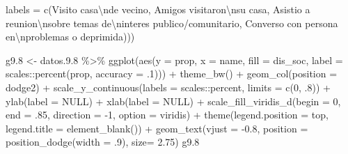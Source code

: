 \documentclass[
  12pt,
]{book}
\newenvironment{Shaded}{\begin{snugshade}}{\end{snugshade}}
\newcommand{\AttributeTok}[1]{\textcolor[rgb]{0.77,0.63,0.00}{#1}}
\newcommand{\ConstantTok}[1]{\textcolor[rgb]{0.00,0.00,0.00}{#1}}
\newcommand{\DecValTok}[1]{\textcolor[rgb]{0.00,0.00,0.81}{#1}}
\newcommand{\FloatTok}[1]{\textcolor[rgb]{0.00,0.00,0.81}{#1}}
\newcommand{\FunctionTok}[1]{\textcolor[rgb]{0.00,0.00,0.00}{#1}}
\newcommand{\NormalTok}[1]{#1}
\newcommand{\OtherTok}[1]{\textcolor[rgb]{0.56,0.35,0.01}{#1}}
\newcommand{\SpecialCharTok}[1]{\textcolor[rgb]{0.00,0.00,0.00}{#1}}
\newcommand{\StringTok}[1]{\textcolor[rgb]{0.31,0.60,0.02}{#1}}
\begin{document}
\begin{Shaded}
\begin{Highlighting}[]
                       \AttributeTok{labels =} \FunctionTok{c}\NormalTok{(}\StringTok{\textquotesingle{}Visito casa}\SpecialCharTok{\textbackslash{}n}\StringTok{de vecino\textquotesingle{}}\NormalTok{,}
                               \StringTok{\textquotesingle{}Amigos visitaron}\SpecialCharTok{\textbackslash{}n}\StringTok{su casa\textquotesingle{}}\NormalTok{,}
                               \StringTok{\textquotesingle{}Asistio a reunion}\SpecialCharTok{\textbackslash{}n}\StringTok{sobre temas de}\SpecialCharTok{\textbackslash{}n}\StringTok{interes publico/comunitario\textquotesingle{}}\NormalTok{,}
                               \StringTok{\textquotesingle{}Converso con persona en}\SpecialCharTok{\textbackslash{}n}\StringTok{problemas o deprimida\textquotesingle{}}\NormalTok{)))}

\NormalTok{g9}\FloatTok{.8} \OtherTok{\textless{}{-}}\NormalTok{ datos.}\FloatTok{9.8} \SpecialCharTok{\%\textgreater{}\%} 
  \FunctionTok{ggplot}\NormalTok{(}\FunctionTok{aes}\NormalTok{(}\AttributeTok{y =}\NormalTok{ prop, }\AttributeTok{x =}\NormalTok{ name, }\AttributeTok{fill =}\NormalTok{ dis\_soc, }
             \AttributeTok{label =}\NormalTok{ scales}\SpecialCharTok{::}\FunctionTok{percent}\NormalTok{(prop, }\AttributeTok{accuracy =}\NormalTok{ .}\DecValTok{1}\NormalTok{))) }\SpecialCharTok{+} 
  \FunctionTok{theme\_bw}\NormalTok{() }\SpecialCharTok{+} 
  \FunctionTok{geom\_col}\NormalTok{(}\AttributeTok{position =} \StringTok{\textquotesingle{}dodge2\textquotesingle{}}\NormalTok{) }\SpecialCharTok{+}
  \FunctionTok{scale\_y\_continuous}\NormalTok{(}\AttributeTok{labels =}\NormalTok{ scales}\SpecialCharTok{::}\NormalTok{percent,}
                     \AttributeTok{limits =} \FunctionTok{c}\NormalTok{(}\DecValTok{0}\NormalTok{, .}\DecValTok{8}\NormalTok{)) }\SpecialCharTok{+}
  \FunctionTok{ylab}\NormalTok{(}\AttributeTok{label =} \ConstantTok{NULL}\NormalTok{) }\SpecialCharTok{+}
  \FunctionTok{xlab}\NormalTok{(}\AttributeTok{label =} \ConstantTok{NULL}\NormalTok{) }\SpecialCharTok{+}
  \FunctionTok{scale\_fill\_viridis\_d}\NormalTok{(}\AttributeTok{begin =} \DecValTok{0}\NormalTok{, }\AttributeTok{end =}\NormalTok{ .}\DecValTok{85}\NormalTok{, }\AttributeTok{direction =} \SpecialCharTok{{-}}\DecValTok{1}\NormalTok{, }\AttributeTok{option =} \StringTok{\textquotesingle{}viridis\textquotesingle{}}\NormalTok{) }\SpecialCharTok{+}
  \FunctionTok{theme}\NormalTok{(}\AttributeTok{legend.position =} \StringTok{\textquotesingle{}top\textquotesingle{}}\NormalTok{,}
        \AttributeTok{legend.title =} \FunctionTok{element\_blank}\NormalTok{()) }\SpecialCharTok{+}
  \FunctionTok{geom\_text}\NormalTok{(}\AttributeTok{vjust =} \SpecialCharTok{{-}}\FloatTok{0.8}\NormalTok{,}
            \AttributeTok{position =} \FunctionTok{position\_dodge}\NormalTok{(}\AttributeTok{width =}\NormalTok{ .}\DecValTok{9}\NormalTok{),}
            \AttributeTok{size=} \FloatTok{2.75}\NormalTok{)}
\NormalTok{g9}\FloatTok{.8}
\end{Highlighting}
\end{Shaded}
\end{document}
